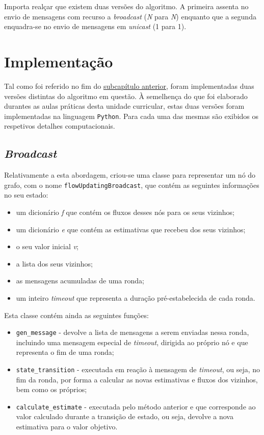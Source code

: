 \documentclass[a4paper]{report}
\begin{document}
{	Importa realçar que existem duas versões do algoritmo. A primeira assenta no envio de mensagens com recurso a \textit{broadcast} (\textit{N} para \textit{N}) enquanto que a segunda enquadra-se no envio de mensagens em \textit{unicast} (1 para 1).


	\section{Implementação} \label{sec:Implementation}
	Tal como foi referido no fim do \hyperref[sec:Concept]{subcapítulo anterior}, foram implementadas duas versões distintas do algoritmo em questão.
	À semelhença do que foi elaborado durantes as aulas práticas desta unidade curricular, estas duas versões foram implementadas na linguagem \texttt{Python}.
	Para cada uma das mesmas são exibidos os respetivos detalhes computacionais.

		\subsection{\textit{Broadcast}} \label{subsec:Broadcast}
		Relativamente a esta abordagem, criou-se uma classe para representar um nó do grafo, com o nome \texttt{flowUpdatingBroadcast}, que contém as seguintes informações no seu estado:
		\begin{itemize}
			\item um dicionário \textit{f} que contém os fluxos desses nós para os seus vizinhos;
			\item um dicionário \textit{e} que contém as estimativas que recebeu dos seus vizinhos;
			\item o seu valor inicial \textit{v};
			\item a lista dos seus vizinhos;
			\item as mensagens acumuladas de uma ronda;
			\item um inteiro \textit{timeout} que representa a duração pré-estabelecida de cada ronda.
		\end{itemize}

		Esta classe contém ainda as seguintes funções:
		\begin{itemize}
			\item \texttt{gen\_message} - devolve a lista de mensagens a serem enviadas nessa ronda, incluindo uma mensagem especial de \textit{timeout}, dirigida ao próprio nó e que representa o fim de uma ronda;
			\item \texttt{state\_transition} - executada em reação à mensagem de \textit{timeout}, ou seja, no fim da ronda, por forma a calcular as novas estimativas e fluxos dos vizinhos, bem como os próprios;
			\item \texttt{calculate\_estimate} - executada pelo método anterior e que corresponde ao valor calculado durante a transição de estado, ou seja, devolve a nova estimativa para o valor objetivo.
		\end{itemize}

}
\end{document}
